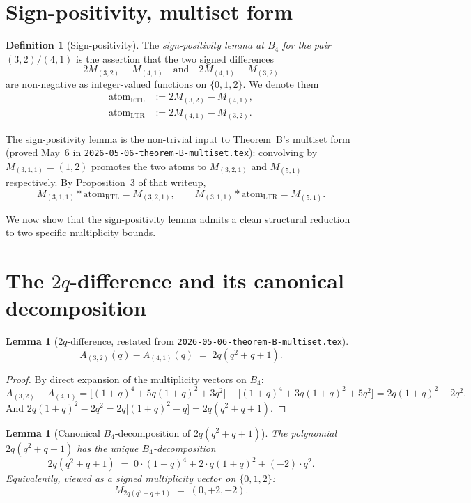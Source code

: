 \documentclass[11pt]{article}
\newtheorem{lemma}[theorem]{Lemma}
\theoremstyle{definition}
\newtheorem{definition}[theorem]{Definition}
\begin{document}
\section{Sign-positivity, multiset form}

\begin{definition}[Sign-positivity]
The \emph{sign-positivity lemma at $B_4$ for the pair $(3,2)/(4,1)$} is the assertion that the two signed differences
\[
2 M_{(3,2)} - M_{(4,1)} \quad \text{and} \quad 2 M_{(4,1)} - M_{(3,2)}
\]
are non-negative as integer-valued functions on $\{0, 1, 2\}$. We denote them
\begin{align*}
\mathrm{atom}_{\mathrm{RTL}} &:= 2 M_{(3,2)} - M_{(4,1)},\\
\mathrm{atom}_{\mathrm{LTR}} &:= 2 M_{(4,1)} - M_{(3,2)}.
\end{align*}
\end{definition}

The sign-positivity lemma is the non-trivial input to Theorem~B's multiset form (proved May~6 in \texttt{2026-05-06-theorem-B-multiset.tex}): convolving by $M_{(3,1,1)} = (1, 2)$ promotes the two atoms to $M_{(3,2,1)}$ and $M_{(5,1)}$ respectively. By Proposition~3 of that writeup,
\[
M_{(3,1,1)} \ast \mathrm{atom}_{\mathrm{RTL}} = M_{(3,2,1)}, \qquad M_{(3,1,1)} \ast \mathrm{atom}_{\mathrm{LTR}} = M_{(5,1)}.
\]

We now show that the sign-positivity lemma admits a clean structural reduction to two specific multiplicity bounds.

\section{The $2q$-difference and its canonical decomposition}

\begin{lemma}[$2q$-difference, restated from \texttt{2026-05-06-theorem-B-multiset.tex}]\label{lem:2q}
\[
A_{(3,2)}(q) - A_{(4,1)}(q) \;=\; 2 q (q^2 + q + 1).
\]
\end{lemma}

\begin{proof}
By direct expansion of the multiplicity vectors on $B_4$:
\[
A_{(3,2)} - A_{(4,1)} = \bigl[(1+q)^4 + 5q(1+q)^2 + 3q^2\bigr] - \bigl[(1+q)^4 + 3q(1+q)^2 + 5q^2\bigr] = 2q(1+q)^2 - 2q^2.
\]
And $2q(1+q)^2 - 2q^2 = 2q\bigl[(1+q)^2 - q\bigr] = 2q(q^2 + q + 1)$.
\end{proof}

\begin{lemma}[Canonical $B_4$-decomposition of $2q(q^2+q+1)$]\label{lem:2q-decomp}
The polynomial $2q(q^2+q+1)$ has the unique $B_4$-decomposition
\[
2q(q^2 + q + 1) \;=\; 0 \cdot (1+q)^4 + 2 \cdot q(1+q)^2 + (-2) \cdot q^2.
\]
Equivalently, viewed as a signed multiplicity vector on $\{0, 1, 2\}$:
\[
M_{2q(q^2+q+1)} \;=\; (0, +2, -2).
\]
\end{lemma}
\end{document}
